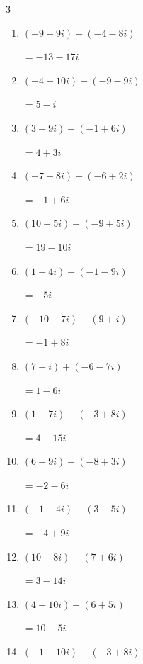 \begin{multicols}{3}
\begin{enumerate}
  \item $\displaystyle (-9-9i) + (-4-8i)$

        $\displaystyle =-13-17i$

  \item $\displaystyle (-4-10i) - (-9-9i)$

        $\displaystyle =5-i$

  \item $\displaystyle (3+9i) - (-1+6i)$

        $\displaystyle =4+3i$

  \item $\displaystyle (-7+8i) - (-6+2i)$

        $\displaystyle =-1+6i$

  \item $\displaystyle (10-5i) - (-9+5i)$

        $\displaystyle =19-10i$

  \item $\displaystyle (1+4i) + (-1-9i)$

        $\displaystyle =-5i$

  \item $\displaystyle (-10+7i) + (9+i)$

        $\displaystyle =-1+8i$

  \item $\displaystyle (7+i) + (-6-7i)$

        $\displaystyle =1-6i$

  \item $\displaystyle (1-7i) - (-3+8i)$

        $\displaystyle =4-15i$

  \item $\displaystyle (6-9i) + (-8+3i)$

        $\displaystyle =-2-6i$

  \item $\displaystyle (-1+4i) - (3-5i)$

        $\displaystyle =-4+9i$

\columnbreak %

  \item $\displaystyle (10-8i) - (7+6i)$

        $\displaystyle =3-14i$

  \item $\displaystyle (4-10i) + (6+5i)$

        $\displaystyle =10-5i$

  \item $\displaystyle (-1-10i) + (-3+8i)$


\end{enumerate}
\end{multicols}
